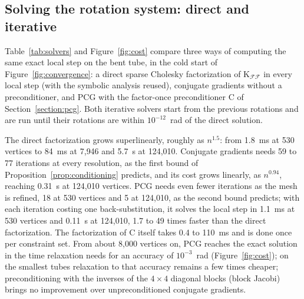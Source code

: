 \documentclass{birkjour}
\theoremstyle{remark}
\numberwithin{equation}{section}
\begin{document}
\subsection{Solving the rotation system: direct and iterative}
\label{section:results_solvers}

Table~\ref{tab:solvers} and Figure~\ref{fig:cost} compare three ways of computing the same exact local step on the bent tube, in the cold start of Figure~\ref{fig:convergence}: a direct sparse Cholesky factorization of $\mathrm K_{\mathcal F \mathcal F}$ in every local step (with the symbolic analysis reused), conjugate gradients without a preconditioner, and PCG with the factor-once preconditioner $\mathrm C$ of Section~\ref{section:pcg}. Both iterative solvers start from the previous rotations and are run until their rotations are within $10^{-12}$~rad of the direct solution.

The direct factorization grows superlinearly, roughly as $n^{1.5}$: from 1.8~ms at 530 vertices to 84~ms at 7{,}946 and 5.7~s at 124{,}010. Conjugate gradients needs 59 to 77 iterations at every resolution, as the first bound of Proposition~\ref{prop:conditioning} predicts, and its cost grows linearly, as $n^{0.94}$, reaching 0.31~s at 124{,}010 vertices. PCG needs even fewer iterations as the mesh is refined, 18 at 530 vertices and 5 at 124{,}010, as the second bound predicts; with each iteration costing one back-substitution, it solves the local step in 1.1~ms at 530 vertices and 0.11~s at 124{,}010, 1.7 to 49 times faster than the direct factorization. The factorization of $\mathrm C$ itself takes 0.4 to 110~ms and is done once per constraint set. From about 8{,}000 vertices on, PCG reaches the exact solution in the time relaxation needs for an accuracy of $10^{-3}$~rad (Figure~\ref{fig:cost}); on the smallest tubes relaxation to that accuracy remains a few times cheaper; preconditioning with the inverses of the $4 \times 4$ diagonal blocks (block Jacobi) brings no improvement over unpreconditioned conjugate gradients.
\end{document}
